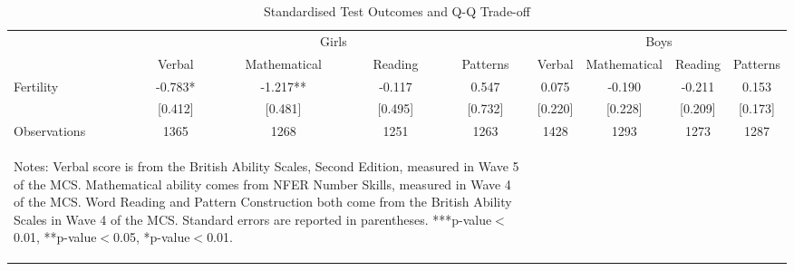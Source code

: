 \begin{table}[htbp]\centering
\def\sym#1{\ifmmode^{#1}\else\(^{#1}\)\fi}
\caption{Standardised Test Outcomes and Q-Q Trade-off}
\begin{tabular}{l*{8}{c}}
\toprule
                    &\multicolumn{4}{c}{Girls}                                      &\multicolumn{4}{c}{Boys}                                       \\\cmidrule(lr){2-5}\cmidrule(lr){6-9}
                    &      Verbal   &Mathematical   &     Reading   &    Patterns   &      Verbal   &Mathematical   &     Reading   &    Patterns   \\
\midrule
Fertility           &      -0.783*  &      -1.217** &      -0.117   &       0.547   &       0.075   &      -0.190   &      -0.211   &       0.153   \\
                    &     [0.412]   &     [0.481]   &     [0.495]   &     [0.732]   &     [0.220]   &     [0.228]   &     [0.209]   &     [0.173]   \\
\midrule
Observations        &        1365   &        1268   &        1251   &        1263   &        1428   &        1293   &        1273   &        1287   \\
\bottomrule\multicolumn{5}{p{14.6cm}}{\begin{footnotesize}        
Notes: Verbal score is from the British Ability Scales, Second Edition, measured in Wave 5 of the MCS. Mathematical ability comes from NFER Number Skills, measured in Wave 4 of the MCS. Word Reading and Pattern Construction both come from the British Ability Scales in Wave 4 of the MCS. Standard errors are reported in parentheses. ***p-value$<$0.01, **p-value$<$0.05, *p-value$<$0.01.                                
\end{footnotesize}}\end{tabular}\end{table}
